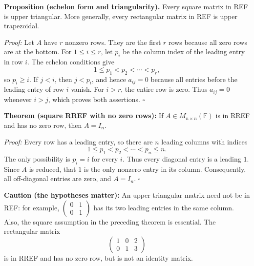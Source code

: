 \documentclass[a4paper,11pt,abstract=true]{scrartcl}
\theoremstyle{dotlessP}
\theoremstyle{dotlessS}
\theoremstyle{remark}
\theoremstyle{definition}
\begin{document}
\begin{claim_box}
\textbf{Proposition (echelon form and triangularity).} Every
square matrix in REF is upper triangular. More generally, every
rectangular matrix in REF is upper trapezoidal.

\textit{Proof:} Let $A$ have $r$ nonzero rows. They are the first $r$
rows because all zero rows are at the bottom. For $1\leq i\leq r$,
let $p_i$ be the column index of the leading entry in row $i$.
The echelon conditions give
\[
1\leq p_1<p_2<\cdots<p_r,
\]
so $p_i\geq i$. If $j<i$, then $j<p_i$, and hence $a_{ij}=0$
because all entries before the leading entry of row $i$ vanish.
For $i>r$, the entire row is zero. Thus $a_{ij}=0$ whenever $i>j$,
which proves both assertions. \hfill$\square$
\end{claim_box}

\begin{claim_box}
\textbf{Theorem (square RREF with no zero rows):} If
$A\in M_{n\times n}(\mathbb{F})$ is in RREF and has no zero row,
then $A=I_n$.

\textit{Proof:} Every row has a leading entry, so there are $n$
leading columns with indices
\[
1\leq p_1<p_2<\cdots<p_n\leq n.
\]
The only possibility is $p_i=i$ for every $i$. Thus every diagonal
entry is a leading $1$. Since $A$ is reduced, that $1$ is the only
nonzero entry in its column. Consequently, all off-diagonal entries
are zero, and $A=I_n$. \hfill$\square$
\end{claim_box}

\begin{remark_box}
\textbf{Caution (the hypotheses matter):} An upper triangular
matrix need not be in REF\@: for example,
$\begin{pmatrix}0&1\\0&1\end{pmatrix}$ has its two leading entries
in the same column. Also, the square assumption in the preceding
theorem is essential. The rectangular matrix
\[
\begin{pmatrix}1&0&2\\0&1&3\end{pmatrix}
\]
is in RREF and has no zero row, but is not an identity matrix.
\end{remark_box}
\end{document}
